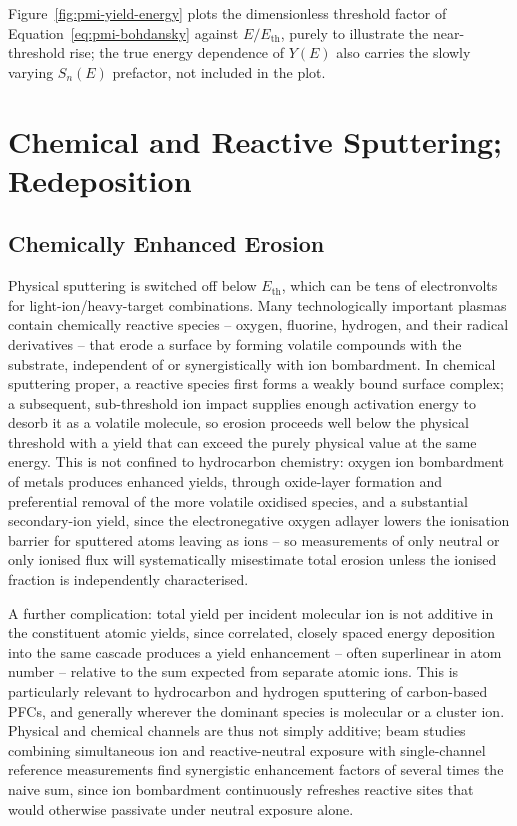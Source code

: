 Figure~\ref{fig:pmi-yield-energy} plots the dimensionless threshold factor of Equation~\eqref{eq:pmi-bohdansky} against $E/E_{\mathrm{th}}$, purely to illustrate the near-threshold rise; the true energy dependence of $Y(E)$ also carries the slowly varying $S_n(E)$ prefactor, not included in the plot.

\section{Chemical and Reactive Sputtering; Redeposition}
\label{sec:pmi-chemical}

\subsection{Chemically Enhanced Erosion}

Physical sputtering is switched off below $E_{\mathrm{th}}$, which can be tens of electronvolts for light-ion/heavy-target combinations. Many technologically important plasmas contain chemically reactive species -- oxygen, fluorine, hydrogen, and their radical derivatives -- that erode a surface by forming volatile compounds with the substrate, independent of or synergistically with ion bombardment. In chemical sputtering proper, a reactive species first forms a weakly bound surface complex; a subsequent, sub-threshold ion impact supplies enough activation energy to desorb it as a volatile molecule, so erosion proceeds well below the physical threshold with a yield that can exceed the purely physical value at the same energy. This is not confined to hydrocarbon chemistry: oxygen ion bombardment of metals produces enhanced yields, through oxide-layer formation and preferential removal of the more volatile oxidised species, and a substantial secondary-ion yield, since the electronegative oxygen adlayer lowers the ionisation barrier for sputtered atoms leaving as ions -- so measurements of only neutral or only ionised flux will systematically misestimate total erosion unless the ionised fraction is independently characterised.

A further complication: total yield per incident molecular ion is not additive in the constituent atomic yields, since correlated, closely spaced energy deposition into the same cascade produces a yield enhancement -- often superlinear in atom number -- relative to the sum expected from separate atomic ions. This is particularly relevant to hydrocarbon and hydrogen sputtering of carbon-based PFCs, and generally wherever the dominant species is molecular or a cluster ion. Physical and chemical channels are thus not simply additive; beam studies combining simultaneous ion and reactive-neutral exposure with single-channel reference measurements find synergistic enhancement factors of several times the naive sum, since ion bombardment continuously refreshes reactive sites that would otherwise passivate under neutral exposure alone.

